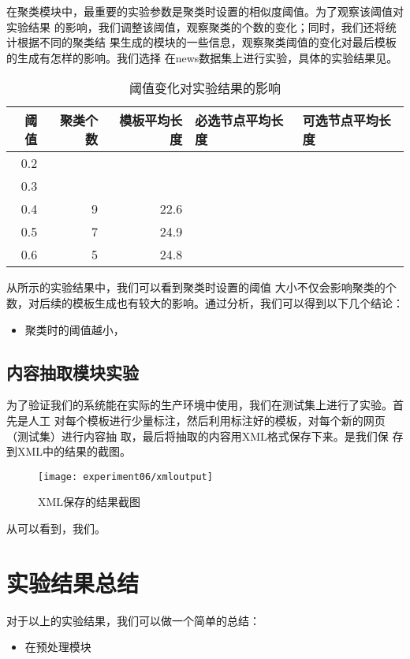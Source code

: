 在聚类模块中，最重要的实验参数是聚类时设置的相似度阈值。为了观察该阈值对实验结果
的影响，我们调整该阈值，观察聚类的个数的变化；同时，我们还将统计根据不同的聚类结
果生成的模块的一些信息，观察聚类阈值的变化对最后模板的生成有怎样的影响。我们选择
在news数据集上进行实验，具体的实验结果见。%

\begin{table}
\begin{tabular}{rrrll}
阈值 & 聚类个数 & 模板平均长度 & 必选节点平均长度 & 可选节点平均长度 \\
\hline
0.2 &  &  &  &  \\
0.3 &  &  &  &  \\
0.4 & 9 & 22.6 &  &  \\
0.5 & 7 & 24.9 &  &  \\
0.6 & 5 & 24.8 &  &  \\
\end{tabular}
\caption{阈值变化对实验结果的影响\label{experiment:tab:threshold}}
\end{table}
\begin{comment}
#+ORGTBL: SEND 阈值变化 orgtbl-to-latex :splice nil :skip 0
| 阈值 | 聚类个数 | 模板平均长度 | 必选节点平均长度 | 可选节点平均长度 |
|------+----------+--------------+------------------+------------------|
|  0.2 |          |              |                  |                  |
|  0.3 |          |              |                  |                  |
|  0.4 |        9 |         22.6 |             4.66 |             2.59 |
|  0.5 |        7 |         24.9 |             4.68 |             2.71 |
|  0.6 |        5 |         24.8 |             3.76 |             2.90 |
|  0.7 |        2 |              |                  |                  |
\end{comment}


从所示的实验结果中，我们可以看到聚类时设置的阈值
大小不仅会影响聚类的个数，对后续的模板生成也有较大的影响。通过分析，我们可以得到以下几个结论：%
\begin{itemize}
\item 聚类时的阈值越小，
\end{itemize}

\subsection{内容抽取模块实验}
为了验证我们的系统能在实际的生产环境中使用，我们在测试集上进行了实验。首先是人工
对每个模板进行少量标注，然后利用标注好的模板，对每个新的网页（测试集）进行内容抽
取，最后将抽取的内容用XML格式保存下来。是我们保
存到XML中的结果的截图。
\begin{figure}[hb]
  \centering
  \texttt{[image: experiment06/xmloutput]}
  \caption{XML保存的结果截图}
  \label{experiment:fig:xmloutput}
\end{figure}

从可以看到，我们。%
\section{实验结果总结}
\label{sec:analysis}
对于以上的实验结果，我们可以做一个简单的总结：%
\begin{itemize}
\item 在预处理模块
\end{itemize}

